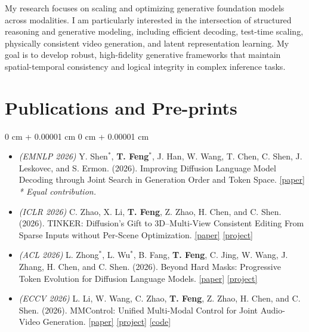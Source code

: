 \documentclass[11pt, letterpaper]{article}
\newenvironment{highlights}{
    \begin{itemize}[
        topsep=0 cm,
        parsep=0 cm,
        partopsep=0pt,
        itemsep=0pt,
        leftmargin=0 cm + 10pt
    ]
}{
    \end{itemize}
}
\newenvironment{onecolentry}{
    \begin{adjustwidth}{
        0 cm + 0.00001 cm
    }{
        0 cm + 0.00001 cm
    }
}{
    \end{adjustwidth}
}
\begin{document}
    \vspace{0.1cm}

    My research focuses on scaling and optimizing generative foundation models across modalities.
    I am particularly interested in the intersection of structured reasoning and generative modeling,
    including efficient decoding, test-time scaling, physically consistent video generation,
    and latent representation learning.
    My goal is to develop robust, high-fidelity generative frameworks that maintain
    spatial-temporal consistency and logical integrity in complex inference tasks.


    \section{Publications and Pre-prints}

    \begin{onecolentry}
    \begin{highlights}

    \item
    \textit{(EMNLP 2026)}
    Y. Shen$^*$, \textbf{T. Feng}$^*$, J. Han, W. Wang, T. Chen,
    C. Shen, J. Leskovec, and S. Ermon. (2026).
    Improving Diffusion Language Model Decoding through Joint Search in
    Generation Order and Token Space.
    \href{https://arxiv.org/abs/2601.20339}
    {\textcolor{NavyBlue}{[paper]}}
    \textit{* Equal contribution.}

    \item
    \label{pub:Tinker}
    \textit{(ICLR 2026)}
    C. Zhao, X. Li, \textbf{T. Feng}, Z. Zhao, H. Chen, and C. Shen. (2026).
    TINKER: Diffusion's Gift to 3D--Multi-View Consistent Editing From Sparse
    Inputs without Per-Scene Optimization.
    \href{https://arxiv.org/abs/2508.14811}
    {\textcolor{NavyBlue}{[paper]}}
    \href{https://aim-uofa.github.io/Tinker/}
    {\textcolor{NavyBlue}{[project]}}

    \item
    \textit{(ACL 2026)}
    L. Zhong$^*$, L. Wu$^*$, B. Fang, \textbf{T. Feng}, C. Jing,
    W. Wang, J. Zhang, H. Chen, and C. Shen. (2026).
    Beyond Hard Masks: Progressive Token Evolution for Diffusion Language Models.
    \href{https://arxiv.org/abs/2601.07351}
    {\textcolor{NavyBlue}{[paper]}}
    \href{https://aim-uofa.github.io/EvoTokenDLM/}
    {\textcolor{NavyBlue}{[project]}}

    \item
    \textit{(ECCV 2026)}
    L. Li, W. Wang, C. Zhao, \textbf{T. Feng}, Z. Zhao, H. Chen, and C. Shen.
    (2026).
    MMControl: Unified Multi-Modal Control for Joint Audio-Video Generation.
    \href{https://arxiv.org/abs/2604.19679v2}
    {\textcolor{NavyBlue}{[paper]}}
    \href{https://aim-uofa.github.io/MMControl/}
    {\textcolor{NavyBlue}{[project]}}
    \href{https://github.com/aim-uofa/MMControl}
    {\textcolor{NavyBlue}{[code]}}

    \end{highlights}
    \end{onecolentry}
\end{document}

